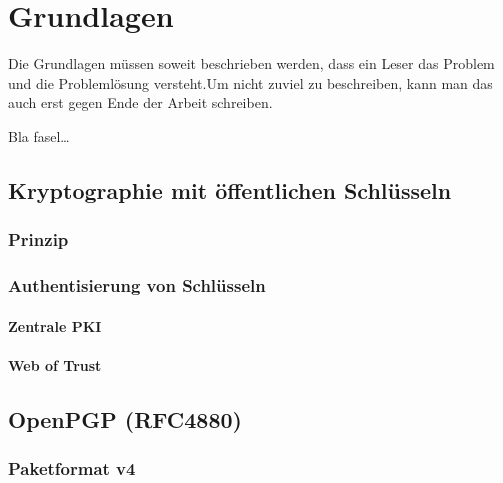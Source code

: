 
\chapter{Grundlagen}
\label{ch:Grundlagen}
Die Grundlagen müssen soweit beschrieben
werden, dass ein Leser das Problem und
die Problemlösung  versteht.Um nicht zuviel 
zu beschreiben, kann man das auch erst gegen 
Ende der Arbeit schreiben.

Bla fasel\ldots

\section{Kryptographie mit öffentlichen Schlüsseln}
\label{ch:Grundlagen:sec:PublicKeyCrypto}

\subsection{Prinzip}
\label{ch:Grundlagen:sec:PublicKeyCrypto:subsec:Prinzip}

\subsection{Authentisierung von Schlüsseln}
\label{ch:Grundlagen:sec:PublicKeyCrypto:subsec:KeyAuth}

\subsubsection{Zentrale PKI}
\label{ch:Grundlagen:sec:PublicKeyCrypto:subsec:KeyAuth:subsubsec:PKI}

\subsubsection{Web of Trust}
\label{ch:Grundlagen:sec:PublicKeyCrypto:subsec:KeyAuth:subsubsec:WOT}

\section{OpenPGP (RFC4880)}
\label{ch:Grundlagen:sec:OpenPGP}

\subsection{Paketformat v4}
\label{ch:Grundlagen:sec:OpenPGP:subsec:PaketFormat}

